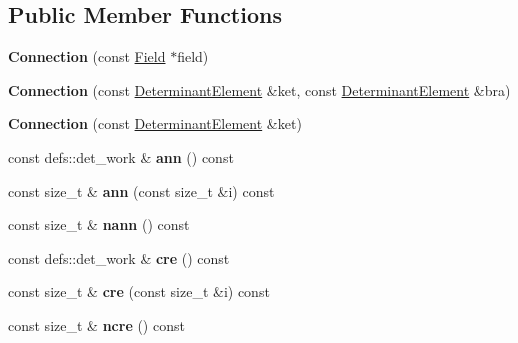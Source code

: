\subsection*{Public Member Functions}
\begin{DoxyCompactItemize}
\item 
{\bfseries Connection} (const \hyperlink{classField}{Field} $\ast$field)\hypertarget{classConnection_af4ce8512ec2e108246299a672a8c6631}{}\label{classConnection_af4ce8512ec2e108246299a672a8c6631}

\item 
{\bfseries Connection} (const \hyperlink{classDeterminantElement}{Determinant\+Element} \&ket, const \hyperlink{classDeterminantElement}{Determinant\+Element} \&bra)\hypertarget{classConnection_a0b96cb58be47c490e4be42a13aae4830}{}\label{classConnection_a0b96cb58be47c490e4be42a13aae4830}

\item 
{\bfseries Connection} (const \hyperlink{classDeterminantElement}{Determinant\+Element} \&ket)\hypertarget{classConnection_ab9d08b55aa2848e5fb6243b543c7c1bb}{}\label{classConnection_ab9d08b55aa2848e5fb6243b543c7c1bb}

\item 
const defs\+::det\+\_\+work \& {\bfseries ann} () const \hypertarget{classConnection_a6be30329b0ea0260472704342cbd435c}{}\label{classConnection_a6be30329b0ea0260472704342cbd435c}

\item 
const size\+\_\+t \& {\bfseries ann} (const size\+\_\+t \&i) const \hypertarget{classConnection_ad672469fe1158702fabc342bb34fc31b}{}\label{classConnection_ad672469fe1158702fabc342bb34fc31b}

\item 
const size\+\_\+t \& {\bfseries nann} () const \hypertarget{classConnection_a3e3347717f29609432141b7eedf750ed}{}\label{classConnection_a3e3347717f29609432141b7eedf750ed}

\item 
const defs\+::det\+\_\+work \& {\bfseries cre} () const \hypertarget{classConnection_a7ac096bbf08c67fc11f7cd8be4e25e47}{}\label{classConnection_a7ac096bbf08c67fc11f7cd8be4e25e47}

\item 
const size\+\_\+t \& {\bfseries cre} (const size\+\_\+t \&i) const \hypertarget{classConnection_a4b466c63cf29f3c8f70b90e4824f2c49}{}\label{classConnection_a4b466c63cf29f3c8f70b90e4824f2c49}

\item 
const size\+\_\+t \& {\bfseries ncre} () const \hypertarget{classConnection_aa6f76ca038d3183e4fdf5f94e47e1a19}{}\label{classConnection_aa6f76ca038d3183e4fdf5f94e47e1a19}


\end{DoxyCompactItemize}

